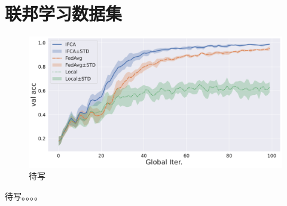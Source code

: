 \section{联邦学习数据集}
\label{sec:chap5-datasets}




\begin{figure}[H]
\centering
\includegraphics[width=\textwidth]{figures/fedproxfemnist.pdf}
\caption{待写}
\label{fig:fedproxfemnist-experiment}
\end{figure}

待写。。。。

